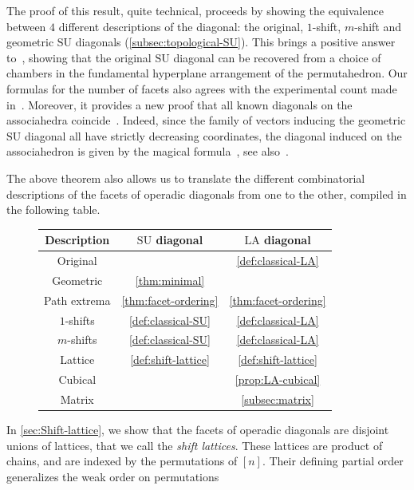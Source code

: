 \documentclass{amsart}
\newcommand{\Guillaume}[1]{\todo[color=magenta!30]{\rm #1 \\ \hfill --- G.}}
\theoremstyle{definition}
\newcommand{\SU}{\mathrm{SU}}
\newcommand{\LA}{\mathrm{LA}}
\begin{document}
The proof of this result, quite technical, proceeds by showing the equivalence between $4$ different descriptions of the diagonal: the original, $1$-shift, $m$-shift and geometric $\SU$ diagonals (\cref{subsec:topological-SU}).
This brings a positive answer to~\cite[Rem.~2.19]{LaplanteAnfossi}, showing that the original $\SU$ diagonal can be recovered from a choice of chambers in the fundamental hyperplane arrangement of the permutahedron. 
Our formulas for the number of facets also agrees with the experimental count made in~\cite{VejdemoJohansson}.
Moreover, it provides a new proof that all known diagonals on the associahedra coincide~\cite{SaneblidzeUmble-comparingDiagonals}.
Indeed, since the family of vectors inducing the geometric $\SU$ diagonal all have strictly decreasing coordinates, the diagonal induced on the associahedron is given by the magical formula~\cite[Thm.~2]{MasudaThomasTonksVallette}, see also~\cite[Prop.~3.8]{LaplanteAnfossi}.

The above theorem also allows us to translate the different combinatorial descriptions of the facets of operadic diagonals from one to the other, compiled in the following table. 

\begin{figure}[h!]
	\begin{center}
	\begin{tabular}{c|c|c}
	Description & $\SU$ diagonal & $\LA$ diagonal \\
	\hline
	Original & \cite{SaneblidzeUmble} & \cref{def:classical-LA} \\
	Geometric & \cref{thm:minimal} & \cite{LaplanteAnfossi} \\
	Path extrema & \cref{thm:facet-ordering} & \cref{thm:facet-ordering} \\
	$1$-shifts & \cref{def:classical-SU} & \cref{def:classical-LA} \\
	$m$-shifts & \cref{def:classical-SU} & \cref{def:classical-LA} \\
	Lattice & \cref{def:shift-lattice} & \cref{def:shift-lattice} \\
	Cubical & \cite{SaneblidzeUmble} & \cref{prop:LA-cubical} \\
	Matrix & \cite{SaneblidzeUmble} & \cref{subsec:matrix} 
	\end{tabular}
	\end{center}
\end{figure}

In \cref{sec:Shift-lattice}, we show that the facets of operadic diagonals are disjoint unions of lattices, that we call the \emph{shift lattices}.
These lattices are product of chains, and are indexed by the permutations of $[n]$.
Their defining partial order generalizes the weak order on permutations \Guillaume{Add relation to facial weak order}
\end{document}
